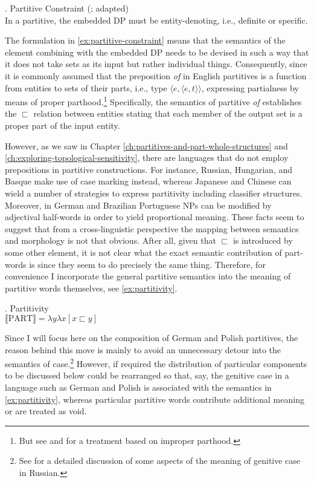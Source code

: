 	\ex. Partitive Constraint (\citealt{de_hoop1997semantic}; adapted)\\
	In a partitive, the embedded DP must be entity-denoting, i.e., definite or specific.\label{ex:partitive-constraint}

	The formulation in \ref{ex:partitive-constraint} means that the semantics of the element combining with the embedded DP needs to be devised in such a way that it does not take sets as its input but rather individual things. Consequently, since \citet{barker1998partitives} it is commonly assumed that the preposition \textit{of} in English partitives is a function from entities to sets of their parts, i.e., type $\langle e,\langle e,t\rangle\rangle$, expressing partialness by means of proper parthood.\footnote{But see \citet{ionin_matushansky_ruys2006parts} and \citet{marty2017implicatures} for a treatment based on improper parthood.} Specifically, the semantics of partitive \textit{of} establishes the $\sqsubset$ relation between entities stating that each member of the output set is a proper part of the input entity. 
	
	However, as we saw in Chapter \ref{ch:partitives-and-part-whole-structures} and \ref{ch:exploring-topological-sensitivity}, there are languages that do not employ prepositions in partitive constructions. For instance, Russian, Hungarian, and Basque make use of case marking instead, whereas Japanese and Chinese can wield a number of strategies to express partitivity including classifier structures. Moreover, in German and Brazilian Portuguese NPs can be modified by adjectival half-words in order to yield proportional meaning. These facts seem to suggest that from a cross-linguistic perspective the mapping between semantics and morphology is not that obvious. After all, given that $\sqsubset$ is introduced by some other element, it is not clear what the exact semantic contribution of part-words is since they seem to do precisely the same thing. Therefore, for convenience I incorporate the general partitive semantics into the meaning of partitive words themselves, see \ref{ex:partitivity}.\largerpage[-1]
	
	\ex. Partitivity\\
	$\llbracket \text{PART}\rrbracket = \lambda y \lambda x [x \sqsubset y]$\label{ex:partitivity}
	
	Since I will focus here on the composition of German and Polish partitives, the reason behind this move is mainly to avoid an unnecessary detour into the semantics of case.\footnote{See \citet{kagan2013semantics} for a detailed discussion of some aspects of the meaning of genitive case in Russian.} However, if required the distribution of particular components to be discussed below could be rearranged so that, say, the genitive case in a language such as German and Polish is associated with the semantics in \ref{ex:partitivity}, whereas particular partitive words contribute additional meaning or are treated as void.
	
